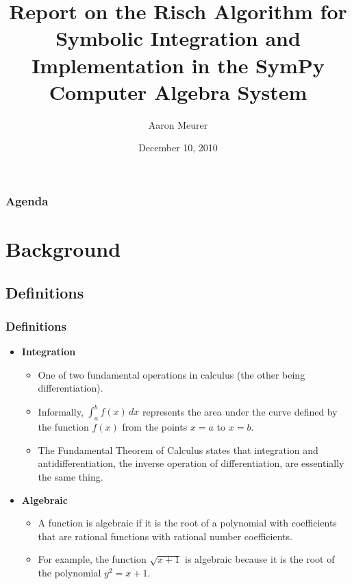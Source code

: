 \documentclass{beamer}
\title{Report on the Risch Algorithm for Symbolic
Integration and Implementation in the SymPy Computer Algebra System}
\author{Aaron Meurer}
\date{December 10, 2010}
\numberwithin{equation}{section} %
\begin{document}
\begin{frame}
    \titlepage
\end{frame}

\begin{frame} 
    \frametitle{Agenda} 
    \tableofcontents 
\end{frame} 

\section{Background}
\subsection{Definitions}

\begin{frame}
    \frametitle{Definitions}
    \begin{itemize}
        \item {\bf Integration} 
        \begin{itemize}
            \item One of two fundamental operations in calculus (the other
            being differentiation).
            \item Informally, $\int_a^b{f(x)\,dx}$ represents the area under
            the curve defined by the function $f(x)$ from the points $x=a$
            to $x=b$.
            \item The Fundamental Theorem of Calculus states that
            integration and antidifferentiation, the inverse operation of
            differentiation, are essentially the same thing.
            \end{itemize}
    \pause
        \item {\bf Algebraic}
        \begin{itemize}
            \item A function is algebraic if it is the root of a polynomial
            with coefficients that are rational functions with rational
            number coefficients.  
            \item For example, the function $\sqrt{x + 1}$ is algebraic
            because it is the root of the polynomial $y^2 = x + 1$. 
        \end{itemize}
    \end{itemize}
\end{frame}
\end{document}
